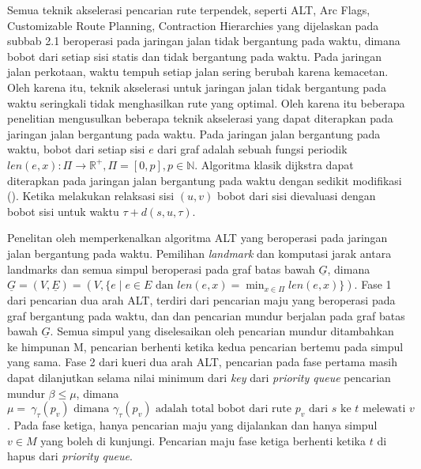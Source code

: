 Semua teknik akselerasi pencarian rute terpendek, seperti ALT, Arc Flags, Customizable Route Planning, Contraction Hierarchies yang dijelaskan pada subbab 2.1 beroperasi pada jaringan jalan tidak bergantung pada waktu, dimana bobot dari setiap sisi statis dan tidak bergantung pada waktu. Pada jaringan jalan perkotaan, waktu tempuh setiap jalan sering berubah karena kemacetan. Oleh karena itu, teknik akselerasi untuk jaringan jalan tidak bergantung pada waktu seringkali tidak menghasilkan rute yang optimal. Oleh karena itu beberapa penelitian mengusulkan beberapa teknik akselerasi yang dapat diterapkan pada jaringan jalan bergantung pada waktu. Pada jaringan jalan bergantung pada waktu, bobot dari setiap sisi $e$ dari graf adalah sebuah fungsi periodik $len(e,x): \Pi \rightarrow \mathbb{R}^{+}, \Pi=[0,p],p\in \mathbb{N}$. Algoritma klasik dijkstra dapat diterapkan pada jaringan jalan bergantung pada waktu dengan sedikit modifikasi (\cite{Cooke1966}). Ketika melakukan relaksasi sisi $(u,v)$ bobot dari sisi dievaluasi dengan bobot sisi untuk waktu $\tau + d(s,u,\tau)$. 

Penelitan oleh \cite{Nannicini2008} memperkenalkan algoritma ALT yang beroperasi pada jaringan jalan bergantung pada waktu. Pemilihan \textit{landmark} dan komputasi jarak antara landmarks dan semua simpul beroperasi pada graf batas bawah $\underline{G}$, dimana $\underline{G}=(V,\underline{E})=(V,\{e \mid e\in E  \text{ dan } len(e, x)=\min_{x\in \Pi } len(e, x)  \})$. Fase 1 dari pencarian dua arah ALT, terdiri dari pencarian maju yang beroperasi pada graf bergantung pada waktu, dan dan pencarian mundur berjalan pada graf batas bawah $\underline{G}$. Semua simpul yang diselesaikan oleh pencarian mundur ditambahkan ke himpunan M, pencarian berhenti ketika kedua pencarian bertemu pada simpul yang sama. Fase 2 dari kueri dua arah ALT, pencarian pada fase pertama masih dapat dilanjutkan selama nilai minimum dari \textit{key} dari \textit{priority queue} pencarian mundur $\beta \leq \mu$, dimana $\mu=\ \gamma_{\tau}(p_v) \text{ dimana }\gamma_{\tau}(p_v)  \text{ adalah total bobot dari rute } p_v \text{ dari } s \text{ ke }t \text{ melewati }v$. Pada fase ketiga, hanya pencarian maju yang dijalankan dan hanya simpul $v\in M$ yang boleh di kunjungi. Pencarian maju fase ketiga berhenti ketika $t$ di hapus dari \textit{priority queue}. 



